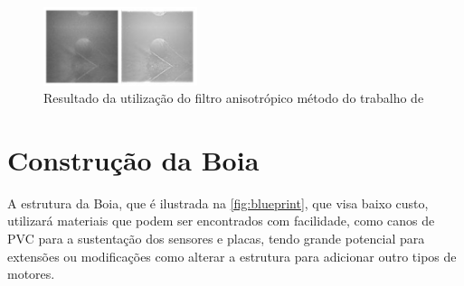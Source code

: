 \begin{figure}[ht]
	\centering
    \caption{\label{fig:anisotop}Resultado da utilização do filtro anisotrópico método do trabalho de }
	\includegraphics[width = 0.4\textwidth]{resources/anisitrop.png}
\end{figure}







\section{Construção da Boia}

A estrutura da Boia, que é ilustrada na \autoref{fig:blueprint}, que visa baixo custo, utilizará materiais que podem ser encontrados com facilidade, como canos de PVC para a sustentação dos sensores e placas, tendo grande potencial para extensões ou modificações como alterar a estrutura para adicionar outro tipos de motores.

